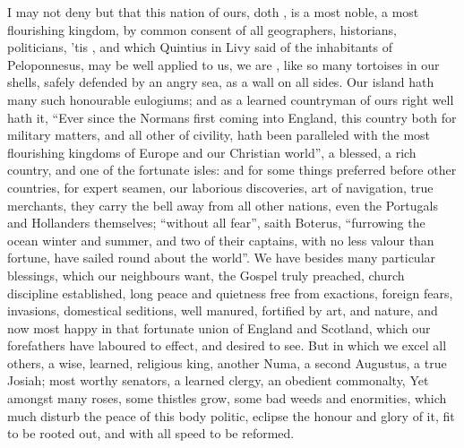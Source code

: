 I may not deny but that this nation of ours, doth , is a most noble, a most flourishing kingdom, by common consent of all
geographers, historians, politicians, 'tis , and which Quintius in Livy said of the inhabitants of
Peloponnesus, may be well applied to us, we are , like so many tortoises in our shells, safely defended by an angry
sea, as a wall on all sides. Our island hath many such honourable eulogiums;
and as a learned countryman of ours right well hath it,
\enquote{Ever since the Normans first coming into England, this
country both for military matters, and all other of civility, hath been
paralleled with the most flourishing kingdoms of Europe and our Christian
world}, a blessed, a rich country, and one of the fortunate isles: and for some
things preferred before other countries, for expert seamen,
our laborious discoveries, art of navigation, true merchants, they carry the
bell away from all other nations, even the Portugals and Hollanders themselves;
\enquote{without all fear}, saith Boterus, \enquote{furrowing the ocean
winter and summer, and two of their captains, with no less valour than fortune,
have sailed round about the world}. We have besides many
particular blessings, which our neighbours want, the Gospel truly preached,
church discipline established, long peace and quietness free from exactions,
foreign fears, invasions, domestical seditions, well manured,
fortified by art, and nature, and now most happy in that
fortunate union of England and Scotland, which our forefathers have laboured to
effect, and desired to see. But in which we excel all others, a wise, learned,
religious king, another Numa, a second Augustus, a true Josiah; most worthy
senators, a learned clergy, an obedient commonalty, \etc{} Yet amongst many
roses, some thistles grow, some bad weeds and enormities, which much disturb
the peace of this body politic, eclipse the honour and glory of it, fit to be
rooted out, and with all speed to be reformed.

